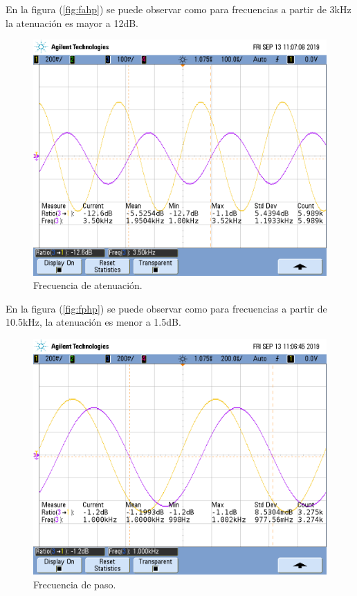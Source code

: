 \documentclass[a4paper]{article}
\begin{document}
En la figura (\ref{fig:fahp}) se puede observar como para frecuencias a partir de 3kHz la atenuación es mayor a 12dB.
\begin{figure}[H]	
	\centering
	\includegraphics[width=\textwidth]{ImagenesEj2/MedicionesGrilla/fa_lp.png}
	\caption{Frecuencia de atenuación.}
	\label{fig:falp}
\end{figure}

En la figura (\ref{fig:fphp}) se puede observar como para frecuencias a partir de 10.5kHz, la atenuación es menor a 1.5dB.

\begin{figure}[H]	
	\centering
	\includegraphics[width=\textwidth]{ImagenesEj2/MedicionesGrilla/fp_lp.png}
	\caption{Frecuencia de paso.}
	\label{fig:fplp}
\end{figure}
\newpage
\end{document}
